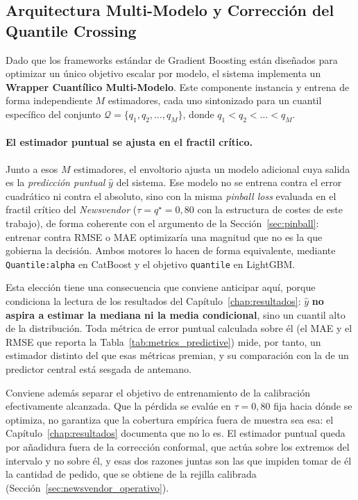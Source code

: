 \subsection{Arquitectura Multi-Modelo y Corrección del Quantile Crossing}
\label{sec:crossing}
Dado que los frameworks estándar de Gradient Boosting están diseñados para optimizar un único objetivo escalar por modelo, el sistema implementa un \textbf{Wrapper Cuantílico Multi-Modelo}. Este componente instancia y entrena de forma independiente $M$ estimadores, cada uno sintonizado para un cuantil específico del conjunto $\mathcal{Q} = \{q_1, q_2, \dots, q_M\}$, donde $q_1 < q_2 < \dots < q_M$.

\paragraph{El estimador puntual se ajusta en el fractil crítico.} Junto a esos $M$ estimadores, el envoltorio ajusta un modelo adicional cuya salida es la \emph{predicción puntual} $\hat{y}$ del sistema. Ese modelo no se entrena contra el error cuadrático ni contra el absoluto, sino con la misma \textit{pinball loss} evaluada en el fractil crítico del \textit{Newsvendor} ($\tau = q^\star = 0{,}80$ con la estructura de costes de este trabajo), de forma coherente con el argumento de la Sección~\ref{sec:pinball}: entrenar contra RMSE o MAE optimizaría una magnitud que no es la que gobierna la decisión. Ambos motores lo hacen de forma equivalente, mediante \texttt{Quantile:alpha} en CatBoost y el objetivo \texttt{quantile} en LightGBM.

Esta elección tiene una consecuencia que conviene anticipar aquí, porque condiciona la lectura de los resultados del Capítulo~\ref{chap:resultados}: $\hat{y}$ \textbf{no aspira a estimar la mediana ni la media condicional}, sino un cuantil alto de la distribución. Toda métrica de error puntual calculada sobre él (el MAE y el RMSE que reporta la Tabla~\ref{tab:metrics_predictive}) mide, por tanto, un estimador distinto del que esas métricas premian, y su comparación con la de un predictor central está sesgada de antemano.

Conviene además separar el objetivo de entrenamiento de la calibración efectivamente alcanzada. Que la pérdida se evalúe en $\tau = 0{,}80$ fija hacia dónde se optimiza, no garantiza que la cobertura empírica fuera de muestra sea esa: el Capítulo~\ref{chap:resultados} documenta que no lo es. El estimador puntual queda por añadidura fuera de la corrección conformal, que actúa sobre los extremos del intervalo y no sobre él, y esas dos razones juntas son las que impiden tomar de él la cantidad de pedido, que se obtiene de la rejilla calibrada (Sección~\ref{sec:newsvendor_operativo}).

